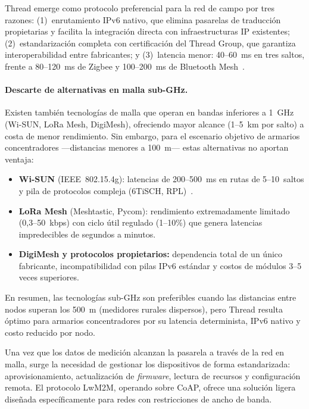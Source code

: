 Thread emerge como protocolo preferencial para la red de campo por tres razones: (1)~enrutamiento IPv6 nativo, que elimina pasarelas de traducción propietarias y facilita la integración directa con infraestructuras IP existentes; (2)~estandarización completa con certificación del Thread Group, que garantiza interoperabilidad entre fabricantes; y (3)~latencia menor: 40--60~ms en tres saltos, frente a 80--120~ms de Zigbee y 100--200~ms de Bluetooth Mesh~\cite{shelby6LoWPANWirelessEmbedded2009,parkScalableThreadMesh2023}.

\paragraph{Descarte de alternativas en malla sub-GHz.}
Existen también tecnologías de malla que operan en bandas inferiores a 1~GHz (Wi-SUN, LoRa Mesh, DigiMesh), ofreciendo mayor alcance (1--5~km por salto) a costa de menor rendimiento. Sin embargo, para el escenario objetivo de armarios concentradores ---distancias menores a 100~m--- estas alternativas no aportan ventaja:

\begin{itemize}
    \item \textbf{Wi-SUN} (IEEE~802.15.4g): latencias de 200--500~ms en rutas de 5--10~saltos y pila de protocolos compleja (6TiSCH, RPL)~\cite{haradaIEEE802154g2017}.
    \item \textbf{LoRa Mesh} (Meshtastic, Pycom): rendimiento extremadamente limitado (0,3--50~kbps) con ciclo útil regulado (1--10\%) que genera latencias impredecibles de segundos a minutos.
    \item \textbf{DigiMesh y protocolos propietarios:} dependencia total de un único fabricante, incompatibilidad con pilas IPv6 estándar y costos de módulos 3--5 veces superiores.
\end{itemize}

En resumen, las tecnologías sub-GHz son preferibles cuando las distancias entre nodos superan los 500~m (medidores rurales dispersos), pero Thread resulta óptimo para armarios concentradores por su latencia determinista, IPv6 nativo y costo reducido por nodo.

Una vez que los datos de medición alcanzan la pasarela a través de la red en malla, surge la necesidad de gestionar los dispositivos de forma estandarizada: aprovisionamiento, actualización de \emph{firmware}, lectura de recursos y configuración remota. El protocolo LwM2M, operando sobre CoAP, ofrece una solución ligera diseñada específicamente para redes con restricciones de ancho de banda.

